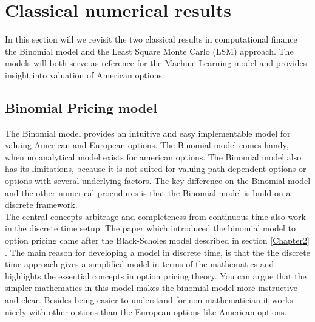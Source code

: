 
\chapter{Classical numerical results} %

\label{Chapter3} %



In this section will we revisit the two classical results in computational finance the Binomial model and the Least Square Monte Carlo (LSM) approach. The models will both serve as reference for the Machine Learning model and provides insight into valuation of American options.


\section{Binomial Pricing model}
The Binomial model provides an intuitive and easy implementable model for valuing American and European options. The Binomial model comes handy, when no analytical model exists for american options. The Binomial model also has its limitations, because it is not suited for valuing path dependent options or options with several underlying factors. The key difference on the Binomial model and the other numerical procudures is that the Binomial model is build on a discrete framework. \\

The central concepts arbitrage and completeness from continuous time also work in the discrete time setup. The paper \parencite{binomial-Paper} which introduced the binomial model to option pricing came after the Black-Scholes model described in section \ref{Chapter2} \parencite{B-S-Paper}. The main reason for developing a model in discrete time, is that the the discrete time approach gives a simplified model in terms of the mathematics and highlights the essential concepts in option pricing theory. You can argue that the simpler mathematics in this model makes the binomial model more instructive and clear. Besides being easier to understand for non-mathematician it works nicely with other options than the European options like American options.\\

